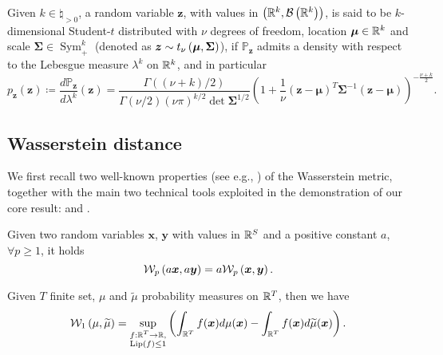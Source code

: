 Given $k \in \natural_{> 0}$, a random variable $\bm{z}$, with values in $\left(\real^k, \borel{\real^k}\right)$, is said to be $k$-dimensional Student-$t$ distributed with $\nu$ degrees of freedom, location $\bm{\mu} \in \real^k$ and scale $\bm{\Sigma} \in \operatorname{Sym}_+^{k}$ (denoted as $\bm{z} \sim \tstud{\nu}{\bm{\mu}}{\bm{\Sigma}}$), if $\mathbb{P}_{\bm{z}}$ admits a density with respect to the Lebesgue measure $\lambda^k$ on $\real^k$, and in particular
\begin{equation*}
	p_{\bm{z}}(\bm{z}) \coloneqq \frac{d\mathbb{P}_{\bm{z}}}{d\lambda^k}(\bm{z}) = \frac{\Gamma((\nu + k)/2)}{\Gamma(\nu/2) (\nu \pi)^{k/2} \det{\bm{\Sigma}}^{1/2}} \left(1 + \frac{1}{\nu} (\bm{z} - \bm{\mu})^T \bm{\Sigma}^{-1} (\bm{z} - \bm{\mu})\right)^{-\frac{\nu + k}{2}}.
\end{equation*}

\subsection{Wasserstein distance} \label{subsec:wassdist}

We first recall two well-known properties (see e.g., \citet{otvillani2008}) of the Wasserstein metric, together with the main two technical tools exploited in the demonstration of our core result:  and .

\begin{proposition} \label{prop:wassmult}
	Given two random variables $\bm{x}$, $\bm{y}$ with values in $\real^S$ and a positive constant $a$, $\forall p \geq 1$, it holds
	\begin{equation} \label{eq:wasslinear}
		\wass[p]{a \bm{x}}{a \bm{y}} = a \wass[p]{\bm{x}}{\bm{y}}.
	\end{equation}
\end{proposition}

\begin{theorem} \label{thm:kantorovichduality}
	Given $T$ finite set, $\mu$ and $\widetilde{\mu}$ probability measures on $\real^T$, then we have
	\begin{equation} \label{eq:kantorovichduality}
		\wass[1]{\mu}{\widetilde{\mu}} = \sup_{\substack{f: \real^T \to \real, \\ \lipschitz{f} \leq 1}} \left(\int_{\real^T} f(\bm{x}) d\mu(\bm{x}) - \int_{\real^T} f(\bm{x}) d\widetilde{\mu}(\bm{x})\right). 
	\end{equation}
\end{theorem}

